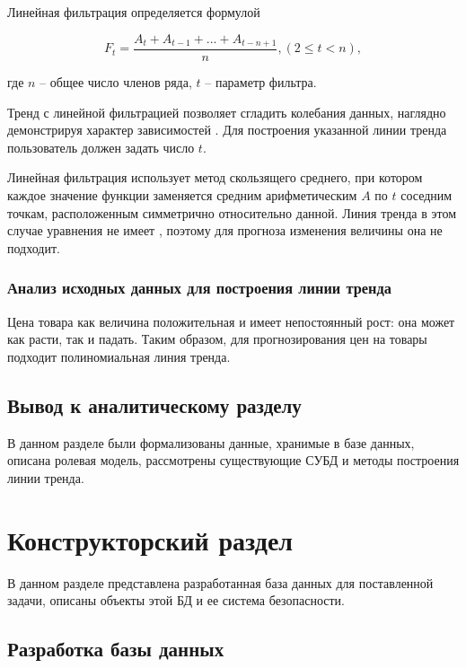 \documentclass[a4paper,14pt]{extreport}
\begin{document}
Линейная фильтрация определяется формулой

\begin{equation}
	F_t = \frac{A_t + A_{t-1} + ... + A_{t-n+1}}{n}, (2 \leqslant t < n),
\end{equation}

где $n$ -- общее число членов ряда, $t$ -- параметр фильтра.

Тренд с линейной фильтрацией позволяет сгладить колебания данных, наглядно демонстрируя характер зависимостей \cite{lt_exel}. Для построения указанной линии тренда пользователь должен задать число $t$.

Линейная фильтрация использует метод скользящего среднего, при котором каждое значение функции заменяется средним арифметическим $A$ по $t$ соседним точкам, расположенным симметрично относительно данной. Линия тренда в этом случае уравнения не имеет \cite{lin_filt}, поэтому для прогноза изменения величины она не подходит.

\subsection{Анализ исходных данных для построения линии тренда}

Цена товара как величина положительная и имеет непостоянный рост: она может как расти, так и падать. Таким образом, для прогнозирования цен на товары подходит полиномиальная линия тренда.

\section*{Вывод к аналитическому разделу}

В данном разделе были формализованы данные, хранимые в базе данных, описана ролевая модель, рассмотрены существующие СУБД и методы построения линии тренда.

\chapter{Конструкторский раздел}

В данном разделе представлена разработанная база данных для поставленной задачи, описаны объекты этой БД и ее система безопасности.

\section{Разработка базы данных}
\end{document}
